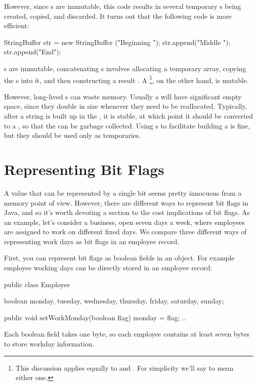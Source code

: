 However, since s are immutable, this code results in several
temporary s being created, copied, and discarded.  It turns out
that the following code is more efficient:
\begin{shortlisting}
	StringBuffer str = new StringBuffer ("Beginning ");
	str.append("Middle ");
    str.append("End");
\end{shortlisting}
s are immutable, concatenating s involves allocating a temporary
 array, copying the s into it, and then constructing
a result . A \footnote{This discussion
applies equally to  and . For
simplicity we'll say  to mean either one.}, on the other hand, is mutable.

However, long-lived s can waste memory. Usually a
 will have significant empty space, since they double in
size whenever they need to be reallocated. Typically, after a string is built up in the
, it is stable, at which point it should be converted 
to a , so that the  can be
garbage collected. Using s to facilitate
building a  is fine, but they should be used only as temporaries.

\section{Representing Bit Flags}
\label{sec:bit-flags}

A value that can be represented by a single bit seems pretty innocuous from a
memory point of view. However, there are different ways to represent bit flags
in Java, and so it's worth devoting a section to the cost implications of
bit flags. As an example, let's consider a business, open seven days a
week, where employees are assigned to work on different fixed days.  We compare three
different ways of representing work days as bit flags in an employee record.
 
First, you can represent bit flags as boolean fields in an object. For example
employee working days can be directly stored in an employee record:
\begin{shortlisting}

    public class Employee {
    	boolean monday, tuesday, wednesday, thursday, friday, saturday, sunday;
    	
    	public void setWorkMonday(boolean flag) {
    		monday = flag;
    	}
    	..
    }
    
\end{shortlisting}
Each boolean field takes one byte, so each employee contains at least seven
bytes to store workday information. 

